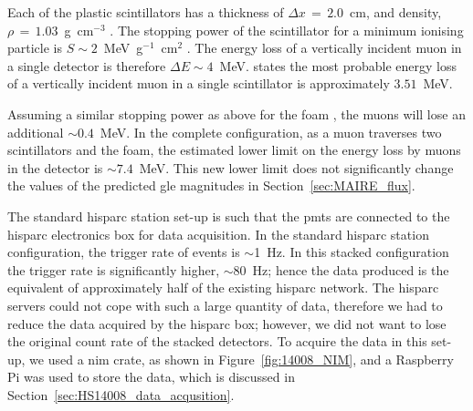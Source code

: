Each of the plastic scintillators has a thickness of $\Delta x \, = \, 2.0$~cm, and density, $\rho \, = \, 1.03$~g~cm$^{-3}$ \citep{montanus_observability_2017}. The stopping power of the scintillator for a minimum ionising particle is $S \sim 2$~MeV~g$^{-1}$~cm$^{2}$ \citep{fokkema_hisparc_2012, montanus_observability_2017}. The energy loss of a vertically incident muon in a single detector is therefore $\Delta E \sim 4$~MeV. \cite{van_dam_hisparc_2020} states the most probable energy loss of a vertically incident muon in a single scintillator is approximately $3.51$~MeV.

Assuming a similar stopping power as above for the foam \citep{groom_muon_2001, montanus_observability_2017}, the muons will lose an additional $\sim 0.4$~MeV. In the complete configuration, as a muon traverses two scintillators and the foam, the estimated lower limit on the energy loss by muons in the detector is $\sim 7.4$~MeV. This new lower limit does not significantly change the values of the predicted \gls{gle} magnitudes in Section~\ref{sec:MAIRE_flux}.

The standard \gls{hisparc} station set-up is such that the \glspl{pmt} are connected to the \gls{hisparc} electronics box for data acquisition. In the standard \gls{hisparc} station configuration, the trigger rate of events is $\sim$1~Hz. In this stacked configuration the trigger rate is significantly higher, $\sim$80~Hz; hence the data produced is the equivalent of approximately half of the existing \gls{hisparc} network. The \gls{hisparc} servers could not cope with such a large quantity of data, therefore we had to reduce the data acquired by the \gls{hisparc} box; however, we did not want to lose the original count rate of the stacked detectors. To acquire the data in this set-up, we used a \gls{nim} crate, as shown in Figure~\ref{fig:14008_NIM}, and a Raspberry Pi was used to store the data, which is discussed in Section~\ref{sec:HS14008_data_acqusition}.

